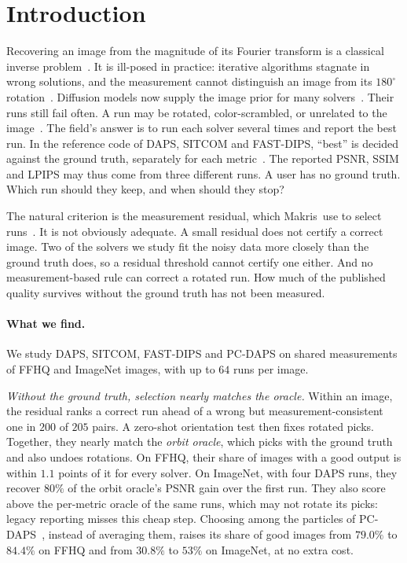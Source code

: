 \section{Introduction}
\label{sec:intro}

Recovering an image from the magnitude of its Fourier transform is a classical inverse problem~\cite{fienup1982phase,shechtman2015phase}.
It is ill-posed in practice: iterative algorithms stagnate in wrong solutions, and the measurement cannot distinguish an image from its $180^\circ$ rotation~\cite{fienup1986stagnation,hayes1982reconstruction}.
Diffusion models now supply the image prior for many solvers~\cite{chung2023dps,zhang2025daps,li2024difffpr,alkhouri2025sitcom,kim2026fastdips}.
Their runs still fail often.
A run may be rotated, color-scrambled, or unrelated to the image~\cite{zhang2025daps,kocabas2026pcdaps}.
The field's answer is to run each solver several times and report the best run.
In the reference code of DAPS, SITCOM and FAST-DIPS, ``best'' is decided against the ground truth, separately for each metric~\cite{zhang2025daps,alkhouri2025sitcom,kim2026fastdips}.
The reported PSNR, SSIM and LPIPS may thus come from three different runs.
A user has no ground truth.
Which run should they keep, and when should they stop?

The natural criterion is the measurement residual, which Makris~\etal use to select runs~\cite{makris2026tgd}.
It is not obviously adequate.
A small residual does not certify a correct image.
Two of the solvers we study fit the noisy data more closely than the ground truth does, so a residual threshold cannot certify one either.
And no measurement-based rule can correct a rotated run.
How much of the published quality survives without the ground truth has not been measured.

\paragraph{What we find.}
We study DAPS, SITCOM, FAST-DIPS and PC-DAPS on shared measurements of FFHQ and ImageNet images, with up to $64$ runs per image.

\emph{Without the ground truth, selection nearly matches the oracle.}
Within an image, the residual ranks a correct run ahead of a wrong but measurement-consistent one in $200$ of $205$ pairs.
A zero-shot orientation test then fixes rotated picks.
Together, they nearly match the \emph{orbit oracle}, which picks with the ground truth and also undoes rotations.
On FFHQ, their share of images with a good output is within $1.1$ points of it for every solver.
On ImageNet, with four DAPS runs, they recover $80\%$ of the orbit oracle's PSNR gain over the first run.
They also score above the per-metric oracle of the same runs, which may not rotate its picks: legacy reporting misses this cheap step.
Choosing among the particles of PC-DAPS~\cite{kocabas2026pcdaps}, instead of averaging them, raises its share of good images from $79.0\%$ to $84.4\%$ on FFHQ and from $30.8\%$ to $53\%$ on ImageNet, at no extra cost.

